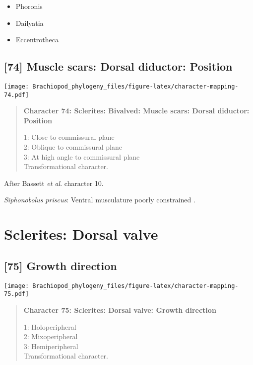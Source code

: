 \documentclass[openany]{book}
\providecommand{\tightlist}{%
  \setlength{\itemsep}{0pt}\setlength{\parskip}{0pt}}
\theoremstyle{definition}
\theoremstyle{definition}
\theoremstyle{definition}
\theoremstyle{remark}
\begin{document}
\begin{itemize}
\tightlist
\item
  Phoronis\\
\item
  Dailyatia\\
\item
  Eccentrotheca
\end{itemize}

\subsection*{{[}74{]} Muscle scars: Dorsal diductor:
Position}\label{muscle-scars-dorsal-diductor-position}

\texttt{[image: Brachiopod\_phylogeny\_files/figure-latex/character-mapping-74.pdf]}

\begin{quote}
\textbf{Character 74: Sclerites: Bivalved: Muscle scars: Dorsal
diductor: Position}

1: Close to commissural plane\\
2: Oblique to commissural plane\\
3: At high angle to commissural plane\\
Transformational character.
\end{quote}

After Bassett \emph{et al}.
\citeyearpar{Bassett2001Functionalmorphology} character 10.

\hypertarget{Siphonobolus_priscus-coding-74}{}
\emph{Siphonobolus priscus}: Ventral musculature poorly constrained
\citep{Williams2000LinguliformeaCraniiformea, Popov2009Earlyontogeny}.

\section{Sclerites: Dorsal valve}\label{sclerites-dorsal-valve}

\subsection*{{[}75{]} Growth direction}\label{growth-direction}

\texttt{[image: Brachiopod\_phylogeny\_files/figure-latex/character-mapping-75.pdf]}

\begin{quote}
\textbf{Character 75: Sclerites: Dorsal valve: Growth direction}

1: Holoperipheral\\
2: Mixoperipheral\\
3: Hemiperipheral\\
Transformational character.
\end{quote}
\end{document}
